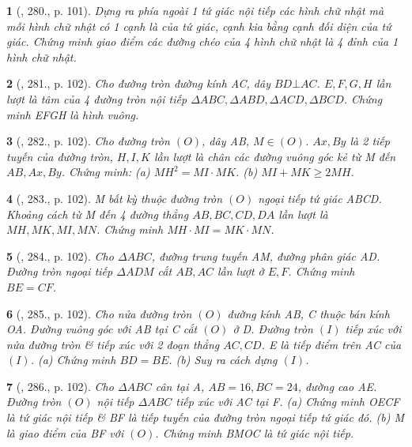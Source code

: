 \documentclass{article}
\newtheorem{baitoan}{}
\begin{document}
\begin{baitoan}[\cite{Binh_Toan_9_tap_2}, 280., p. 101]
	Dựng ra phía ngoài 1 tứ giác nội tiếp các hình chữ nhật mà mỗi hình chữ nhật có 1 cạnh là của tứ giác, cạnh kia bằng cạnh đối diện của tứ giác. Chứng minh giao điểm các đường chéo của 4 hình chữ nhật là 4 đỉnh của 1 hình chữ nhật.
\end{baitoan}

\begin{baitoan}[\cite{Binh_Toan_9_tap_2}, 281., p. 102]
	Cho đường tròn đường kính AC, dây $BD\bot AC$. $E,F,G,H$ lần lượt là tâm của 4 đường tròn nội tiếp $\Delta ABC,\Delta ABD,\Delta ACD,\Delta BCD$. Chứng minh EFGH là hình vuông.
\end{baitoan}

\begin{baitoan}[\cite{Binh_Toan_9_tap_2}, 282., p. 102]
	Cho đường tròn $(O)$, dây AB, $M\in(O)$. $Ax,By$ là 2 tiếp tuyến của đường tròn, $H,I,K$ lần lượt là chân các đường vuông góc kẻ từ M đến $AB,Ax,By$. Chứng minh: (a) $MH^2 = MI\cdot MK$. (b) $MI + MK\ge2MH$.
\end{baitoan}

\begin{baitoan}[\cite{Binh_Toan_9_tap_2}, 283., p. 102]
	M bất kỳ thuộc đường tròn $(O)$ ngoại tiếp tứ giác ABCD. Khoảng cách từ M đến 4 đường thẳng $AB,BC,CD,DA$ lần lượt là $MH,MK,MI,MN$. Chứng minh $MH\cdot MI = MK\cdot MN$.
\end{baitoan}

\begin{baitoan}[\cite{Binh_Toan_9_tap_2}, 284., p. 102]
	Cho $\Delta ABC$, đường trung tuyến AM, đường phân giác AD. Đường tròn ngoại tiếp $\Delta ADM$ cắt $AB,AC$ lần lượt ở $E,F$. Chứng minh $BE = CF$.
\end{baitoan}

\begin{baitoan}[\cite{Binh_Toan_9_tap_2}, 285., p. 102]
	Cho nửa đường tròn $(O)$ đường kính AB, C thuộc bán kính OA. Đường vuông góc với AB tại C cắt $(O)$ ở D. Đường tròn $(I)$ tiếp xúc với nửa đường tròn \& tiếp xúc với 2 đoạn thẳng $AC,CD$. E là tiếp điểm trên AC của $(I)$. (a) Chứng minh $BD = BE$. (b) Suy ra cách dựng $(I)$.
\end{baitoan}

\begin{baitoan}[\cite{Binh_Toan_9_tap_2}, 286., p. 102]
	Cho $\Delta ABC$ cân tại A, $AB = 16,BC = 24$, đường cao AE. Đường tròn $(O)$ nội tiếp $\Delta ABC$ tiếp xúc với AC tại F. (a) Chứng minh OECF là tứ giác nội tiếp \& BF là tiếp tuyến của đường tròn ngoại tiếp tứ giác đó. (b) M là giao điểm của BF với $(O)$. Chứng minh BMOC là tứ giác nội tiếp.
\end{baitoan}
\end{document}
